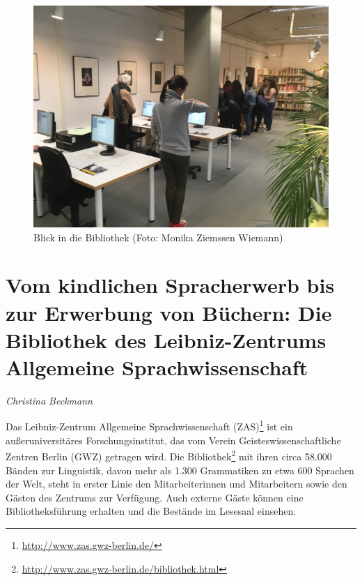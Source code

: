 \documentclass[a4paper,
fontsize=11pt,
oneside,
numbers=noperiodatend,
parskip=half-,
bibliography=totoc,
final
]{scrartcl}
\begin{document}
\begin{figure}
\centering
\includegraphics{img/SAM_1436.jpg}
\caption{Blick in die Bibliothek (Foto: Monika Ziemssen Wiemann)}
\end{figure}

\newpage

\hypertarget{vom-kindlichen-spracherwerb-bis-zur-erwerbung-von-buxfcchern-die-bibliothek-des-leibniz-zentrums-allgemeine-sprachwissenschaft}{%
\section{Vom kindlichen Spracherwerb bis zur Erwerbung von
Büchern: Die Bibliothek des Leibniz-Zentrums Allgemeine
Sprachwissenschaft}\label{vom-kindlichen-spracherwerb-bis-zur-erwerbung-von-buxfcchern-die-bibliothek-des-leibniz-zentrums-allgemeine-sprachwissenschaft}}

\emph{Christina Beckmann}

Das Leibniz-Zentrum Allgemeine Sprachwissenschaft (ZAS)\footnote{\url{http://www.zas.gwz-berlin.de/}}
ist ein außeruniversitäres Forschungsinstitut, das vom Verein
Geisteswissenschaftliche Zentren Berlin (GWZ) getragen wird. Die
Bibliothek\footnote{\url{http://www.zas.gwz-berlin.de/bibliothek.html}}
mit ihren circa 58.000 Bänden zur Linguistik, davon mehr als 1.300
Grammatiken zu etwa 600 Sprachen der Welt, steht in erster Linie den
Mitarbeiterinnen und Mitarbeitern sowie den Gästen des Zentrums zur
Verfügung. Auch externe Gäste können eine Bibliotheksführung erhalten
und die Bestände im Lesesaal einsehen.
\end{document}
